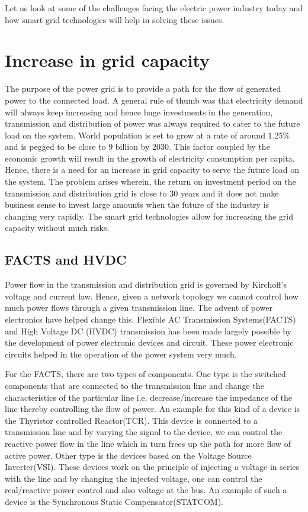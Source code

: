 \documentclass[11pt,a4paper]{article}
\begin{document}
Let us look at some of the challenges facing the electric power industry today and how smart grid technologies will help in solving these issues.

\section{Increase in grid capacity}
The purpose of the power grid is to provide a path for the flow of generated power to the connected load. A general rule of thumb was that electricity demand will always keep increasing and hence huge investments in the generation, transmission and distribution of power was always required to cater to the future load on the system. World population is set to grow at a rate of around 1.25\% and is pegged to be close to 9 billion by 2030. This factor coupled by the economic growth will result in the growth of electricity consumption per capita. Hence, there is a need for an increase in grid capacity to serve the future load on the system. The problem arises wherein, the return on investment period on the transmission and distribution grid is close to 30 years and it does not make business sense to invest large amounts when the future of the industry is changing very rapidly. The smart grid technologies allow for increasing the grid capacity without much risks.

\subsection{FACTS and HVDC}
Power flow in the transmission and distribution grid is governed by Kirchoff's voltage and current law. Hence, given a network topology we cannot control how much power flows through a given transmission line. The advent of power electronics have helped change this. Flexible AC Transmission Systems(FACTS) and High Voltage DC (HVDC) transmission has been made largely possible by the development of power electronic devices and circuit. These power electronic circuits helped in the operation of the power system very much.

For the FACTS, there are two types of components. One type is the switched components that are connected to the transmission line and change the characteristics of the particular line i.e. decrease/increase the impedance of the line thereby controlling the flow of power. An example for this kind of a device is the Thyristor controlled Reactor(TCR). This device is connected to a transmission line and by varying the signal to the device, we can control the reactive power flow in the line which in turn frees up the path for more flow of active power. Other type is the devices based on the Voltage Source Inverter(VSI). These devices work on the principle of injecting a voltage in series with the line and by changing the injected voltage, one can control the real/reactive power control and also voltage at the bus. An example of such a device is the Synchronous Static Compensator(STATCOM)\cite{g2001understanding}.
\end{document}
